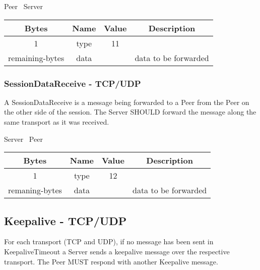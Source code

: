 \begin{center}
    Peer \textrightarrow\ Server\\
    \begin{tabular}{|c|c|c|c|}
        \hline
        \textbf{Bytes} & \textbf{Name} & \textbf{Value} & \textbf{Description}           \\
        \hline
        1              & type          & 11             &                                \\
        \hline
        remaining-bytes    & data          &                & data to be forwarded           \\
        \hline
    \end{tabular}
\end{center}

\subsubsection{SessionDataReceive - TCP/UDP}

A SessionDataReceive is a message being forwarded to a Peer from the Peer on the other side of the
session. The Server SHOULD forward the message along the same transport as it was received.

\begin{center}
    Server \textrightarrow\ Peer\\
    \begin{tabular}{|c|c|c|c|}
        \hline
        \textbf{Bytes} & \textbf{Name} & \textbf{Value} & \textbf{Description}           \\
        \hline
        1              & type          & 12             &                                \\
        \hline
        remaning-bytes    & data          &                & data to be forwarded           \\
        \hline
    \end{tabular}
\end{center}

\subsection{Keepalive - TCP/UDP}

For each transport (TCP and UDP), if no message has been sent in KeepaliveTimeout a Server sends a keepalive
message over the respective transport. The Peer MUST respond with another Keepalive message.\\

